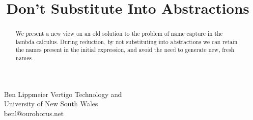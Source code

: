 \documentclass[preprint]{sigplanconf}
\begin{document}
\title  {Don't Substitute Into Abstractions} 

\authorinfo
{       Ben Lippmeier   }
{ \shortstack
  {     Vertigo Technology and \\
        University of New South Wales \\[2pt]
        \textsf{benl@ouroborus.net}
  }
}

\maketitle

\begin{abstract}
We present a new view on an old solution to the problem of name capture in the lambda calculus. During reduction, by not substituting into abstractions we can retain the names present in the initial expression, and avoid the need to generate new, fresh names. 
\end{abstract}












\end{document}
